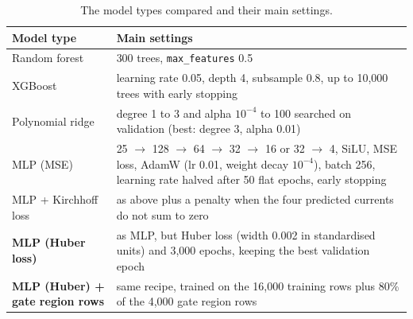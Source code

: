 \documentclass[10pt,a4paper]{article}
\newcommand{\best}[1]{\textbf{#1}}
\begin{document}
\begin{table}[H]
\centering\small
\begin{tabularx}{\linewidth}{@{}lX@{}}
\toprule
Model type & Main settings\\
\midrule
Random forest & 300 trees, \texttt{max\_features} 0.5\\
XGBoost & learning rate 0.05, depth 4, subsample 0.8, up to 10,000 trees with early stopping\\
Polynomial ridge & degree 1 to 3 and alpha $10^{-4}$ to 100 searched on validation (best: degree 3, alpha 0.01)\\
MLP (MSE) & 25 $\rightarrow$ 128 $\rightarrow$ 64 $\rightarrow$ 32 $\rightarrow$ 16 or 32 $\rightarrow$ 4, SiLU, MSE loss, AdamW (lr 0.01, weight decay $10^{-4}$), batch 256, learning rate halved after 50 flat epochs, early stopping\\
MLP + Kirchhoff loss & as above plus a penalty when the four predicted currents do not sum to zero\\
\best{MLP (Huber loss)} & as MLP, but Huber loss (width 0.002 in standardised units) and 3,000 epochs, keeping the best validation epoch\\
\best{MLP (Huber) + gate region rows} & same recipe, trained on the 16,000 training rows plus 80\% of the 4,000 gate region rows\\
\bottomrule
\end{tabularx}
\caption{The model types compared and their main settings.}
\end{table}
\end{document}
